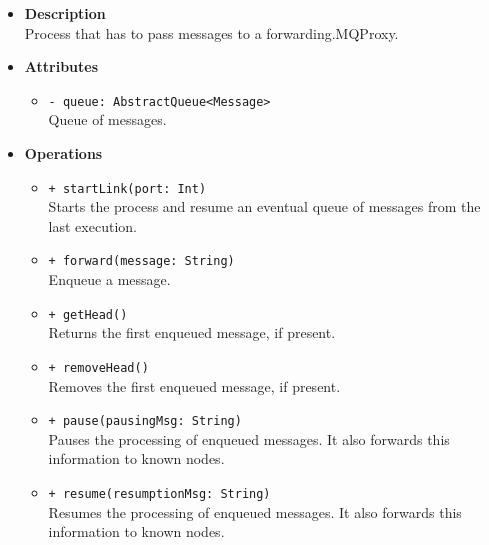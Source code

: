 \FloatBarrier
\begin{itemize}
  \item \textbf{Description} \\
    Process that has to pass messages to a forwarding.MQProxy.
  \item \textbf{Attributes}
    \begin{itemize}
      \item \texttt{- queue: AbstractQueue<Message>} \\
    Queue of messages.
    \end{itemize}
  \item \textbf{Operations}
  \begin{itemize}
    \item \texttt{+ startLink(port: Int)} \\
    Starts the process and resume an eventual queue of messages from the
    last execution.
    \item \texttt{+ forward(message: String)} \\
    Enqueue a message.
    \item \texttt{+ getHead()} \\
    Returns the first enqueued message, if present.
    \item \texttt{+ removeHead()} \\
    Removes the first enqueued message, if present.
    \item \texttt{+ pause(pausingMsg: String)} \\
    Pauses the processing of enqueued messages. It also forwards this
    information to known nodes.
    \item \texttt{+ resume(resumptionMsg: String)} \\
    Resumes the processing of enqueued messages. It also forwards this
    information to known nodes.
  \end{itemize}
\end{itemize}

